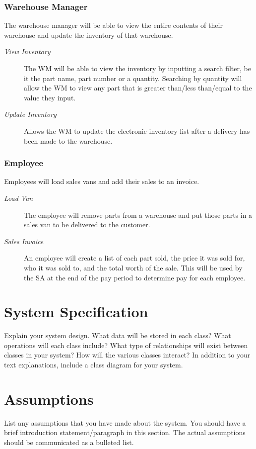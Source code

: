 \documentclass{report}
\begin{document}
\subsubsection{Warehouse Manager}
The warehouse manager will be able to view the entire contents of their warehouse and update the inventory of that warehouse.\par
\begin{description}
  \item[\textit{View Inventory}] The WM will be able to view the inventory by inputting a search filter, be it the part name, part number or a quantity. Searching by quantity will allow the WM to view any part that is greater than/less than/equal to the value they input.\par
  \item[\textit{Update Inventory}] Allows the WM to update the electronic inventory list after a delivery has been made to the warehouse.\par
\end{description}
\subsubsection{Employee}
Employees will load sales vans and add their sales to an invoice.\par
\begin{description}
  \item[\textit{Load Van}] The employee will remove parts from a warehouse and put those parts in a sales van to be delivered to the customer.\par
  \item[\textit{Sales Invoice}] An employee will create a list of each part sold, the price it was sold for, who it was sold to, and the total worth of the sale. This will be used by the SA at the end of the pay period to determine pay for each employee.\par
\end{description}
\section{System Specification}
Explain your system design. What data will be stored in each class?  What operations will each class include?  What type of relationships will exist between classes in your system? How will the various classes interact? In addition to your text explanations, include a class diagram for your system.\par
\section{Assumptions}
List any assumptions that you have made about the system. You should have a brief introduction statement/paragraph in this section. The actual assumptions should be communicated as a bulleted list.\par
\end{document}
